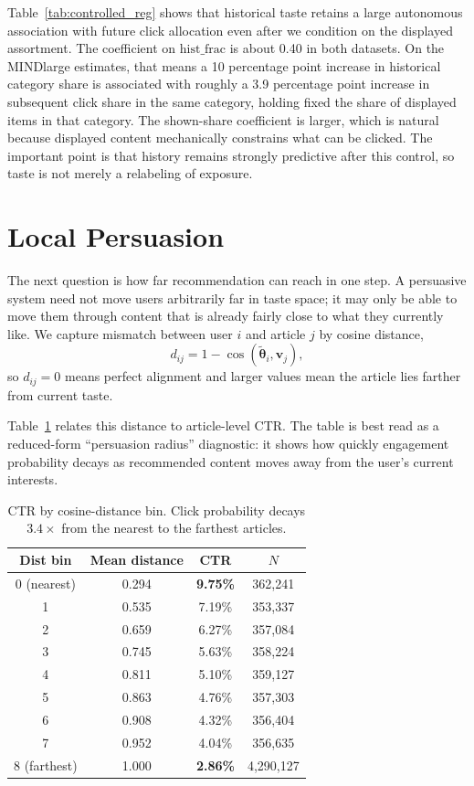 \documentclass[11pt]{article}
\begin{document}
Table~\ref{tab:controlled_reg} shows that historical taste retains a large autonomous association with future click allocation even after we condition on the displayed assortment. The coefficient on $\text{hist\_frac}$ is about 0.40 in both datasets. On the MINDlarge estimates, that means a 10 percentage point increase in historical category share is associated with roughly a 3.9 percentage point increase in subsequent click share in the same category, holding fixed the share of displayed items in that category. The shown-share coefficient is larger, which is natural because displayed content mechanically constrains what can be clicked. The important point is that history remains strongly predictive after this control, so taste is not merely a relabeling of exposure.

\section{Local Persuasion}
\label{sec:persuasion}

The next question is how far recommendation can reach in one step. A persuasive system need not move users arbitrarily far in taste space; it may only be able to move them through content that is already fairly close to what they currently like. We capture mismatch between user $i$ and article $j$ by cosine distance,
\[
d_{ij} = 1 - \cos(\tilde{\boldsymbol{\theta}}_i,\mathbf{v}_j),
\]
so $d_{ij}=0$ means perfect alignment and larger values mean the article lies farther from current taste.

Table~\ref{tab:persuasion_radius} relates this distance to article-level CTR. The table is best read as a reduced-form ``persuasion radius'' diagnostic: it shows how quickly engagement probability decays as recommended content moves away from the user's current interests.

\begin{table}[ht]
\centering
\caption{CTR by cosine-distance bin. Click probability decays $3.4\times$ from the nearest to the farthest articles.}
\label{tab:persuasion_radius}
\begin{tabular}{cccc}
\toprule
Dist bin & Mean distance & CTR & $N$ \\
\midrule
0 (nearest) & 0.294 & \textbf{9.75\%} & 362,241 \\
1 & 0.535 & 7.19\% & 353,337 \\
2 & 0.659 & 6.27\% & 357,084 \\
3 & 0.745 & 5.63\% & 358,224 \\
4 & 0.811 & 5.10\% & 359,127 \\
5 & 0.863 & 4.76\% & 357,303 \\
6 & 0.908 & 4.32\% & 356,404 \\
7 & 0.952 & 4.04\% & 356,635 \\
8 (farthest) & 1.000 & \textbf{2.86\%} & 4,290,127 \\
\bottomrule
\end{tabular}
\end{table}
\FloatBarrier
\end{document}
